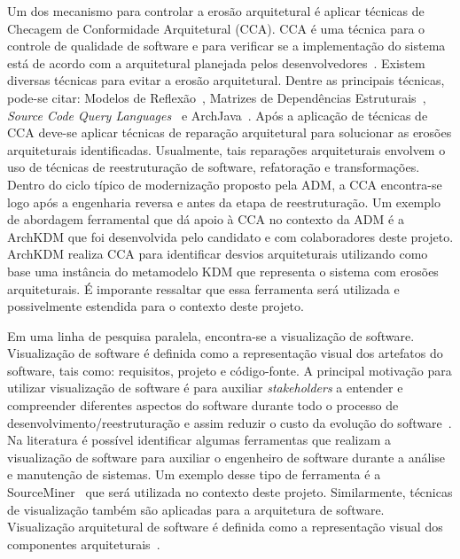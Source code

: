 \documentclass[12pt]{article}
\begin{document}
Um dos mecanismo para controlar a erosão arquitetural é aplicar técnicas de Checagem de Conformidade Arquitetural (CCA). CCA é uma técnica para o controle de qualidade de software e para verificar se a implementação do sistema está de acordo com a arquitetural planejada pelos desenvolvedores~\cite{Knodel_2007}. Existem diversas técnicas para evitar a erosão arquitetural. Dentre as principais técnicas, pode-se citar: Modelos de Reflexão~\cite{Murphy_1995}, Matrizes de Dependências Estruturais~\cite{Sangal_2005}, \textit{Source Code Query Languages}~\cite{Verbaere_2008} e ArchJava~\cite{ArchJava_2202}. Após a aplicação de técnicas de CCA deve-se aplicar técnicas de reparação arquitetural para solucionar as erosões arquiteturais identificadas. Usualmente, tais reparações arquiteturais envolvem o uso de técnicas de reestruturação de software, refatoração e transformações. Dentro do ciclo típico de modernização proposto pela ADM, a CCA encontra-se logo após a engenharia reversa e antes da etapa de reestruturação. Um exemplo de abordagem ferramental que dá apoio à CCA no contexto da ADM é a ArchKDM que foi desenvolvida pelo candidato e com colaboradores deste projeto. ArchKDM realiza CCA para identificar desvios arquiteturais utilizando como base uma instância do metamodelo KDM que representa o sistema com erosões arquiteturais. É imporante ressaltar que essa ferramenta será utilizada e possivelmente estendida para o contexto deste projeto.

Em uma linha de pesquisa paralela, encontra-se a visualização de software. Visualização de software é definida como a representação visual dos artefatos do software, tais como: requisitos, projeto e código-fonte. A principal motivação para utilizar visualização de software é para auxiliar \textit{stakeholders} a entender e compreender diferentes aspectos do software durante todo o processo de desenvolvimento/reestruturação e assim reduzir o custo da evolução do software~\cite{Diehl_2007, Gallagher_2008}. Na literatura é possível identificar algumas ferramentas que realizam a visualização de software para auxiliar o engenheiro de software durante a análise e manutenção de sistemas. Um exemplo desse tipo de  ferramenta é a SourceMiner~\cite{source_miner_glauco} que será utilizada no contexto deste projeto. Similarmente, técnicas de visualização também são aplicadas para a arquitetura de software. Visualização arquitetural de software é definida como a representação visual dos componentes arquiteturais~\cite{Diehl_2007}. %
\end{document}
